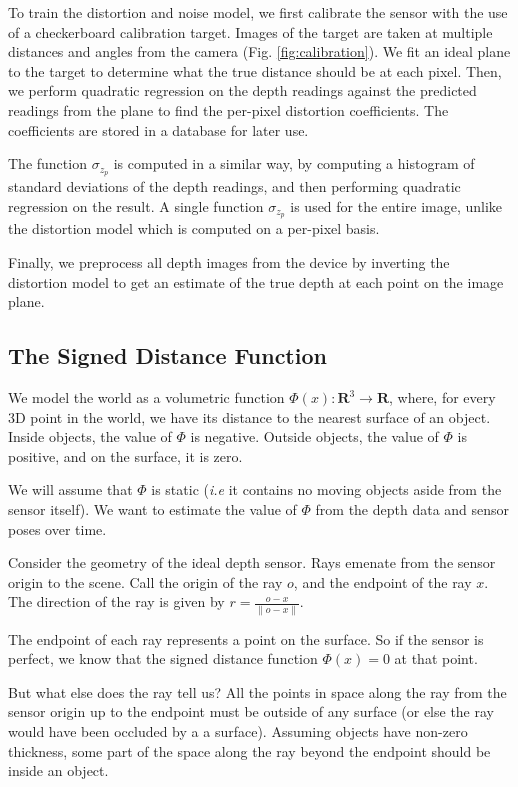  To train the distortion and noise model, we first calibrate the sensor with the
 use of a checkerboard calibration target. Images of the target are taken at
 multiple distances and angles from the camera (Fig. \ref{fig:calibration}). We
 fit an ideal plane to the target to determine what the true distance should be
 at each pixel. Then, we perform quadratic regression on the depth readings
 against the predicted readings from the plane to find the per-pixel distortion
 coefficients. The coefficients are stored in a database for later use.

The function $\sigma_{z_p}$ is computed in a similar way, by computing a
histogram of standard deviations of the depth readings, and then performing
quadratic regression on the result. A single function $\sigma_{z_p}$ is used for
the entire image, unlike the distortion model which is computed on a per-pixel
basis.

Finally, we preprocess all depth images from the device by inverting the
distortion model to get an estimate of the true depth at each point on the
image plane.

\subsection{The Signed Distance Function}
We model the world as a volumetric function $\Phi(x) : \mathbf{R}^3 \to
\mathbf{R}$, where, for every 3D point in the world, we have its distance to the
nearest surface of an object. Inside objects, the value of $\Phi$ is negative.
Outside objects, the value of $\Phi$ is positive, and on the surface, it is
zero.

 We will assume that $\Phi$ is static (\textit{i.e} it contains no moving
 objects aside from the sensor itself). We want to estimate the value of $\Phi$
 from the depth data and sensor poses over time.

Consider the geometry of the ideal depth sensor. Rays emenate from the sensor
origin to the scene. Call the origin of the ray $o$, and the endpoint of the ray
$x$. The direction of the ray is given by $r = \frac{o - x}{\|o - x\|}$.

The endpoint of each ray represents a point on the surface. So if the sensor is
perfect, we know that the signed distance function $\Phi(x) = 0$ at that point. 

But what else does the ray tell us? All the points in space along the ray from
the sensor origin up to the endpoint must be outside of any surface (or else the
ray would have been occluded by a a surface). Assuming objects have non-zero
thickness, some part of the space along the ray beyond the endpoint should be
inside an object. 

